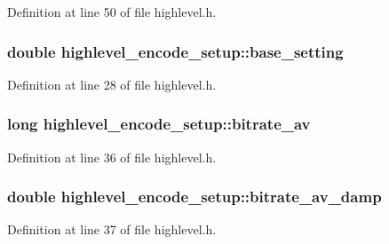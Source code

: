 Definition at line 50 of file highlevel.\+h.

\subsubsection[{\texorpdfstring{base\+\_\+setting}{base_setting}}]{\setlength{\rightskip}{0pt plus 5cm}double highlevel\+\_\+encode\+\_\+setup\+::base\+\_\+setting}\hypertarget{structhighlevel__encode__setup_a3bc13656a789f18e24a9d3a29e0ad2f8}{}\label{structhighlevel__encode__setup_a3bc13656a789f18e24a9d3a29e0ad2f8}


Definition at line 28 of file highlevel.\+h.

\subsubsection[{\texorpdfstring{bitrate\+\_\+av}{bitrate_av}}]{\setlength{\rightskip}{0pt plus 5cm}long highlevel\+\_\+encode\+\_\+setup\+::bitrate\+\_\+av}\hypertarget{structhighlevel__encode__setup_ac9bf8d9dc914f6f82e9ae90429c604f8}{}\label{structhighlevel__encode__setup_ac9bf8d9dc914f6f82e9ae90429c604f8}


Definition at line 36 of file highlevel.\+h.

\subsubsection[{\texorpdfstring{bitrate\+\_\+av\+\_\+damp}{bitrate_av_damp}}]{\setlength{\rightskip}{0pt plus 5cm}double highlevel\+\_\+encode\+\_\+setup\+::bitrate\+\_\+av\+\_\+damp}\hypertarget{structhighlevel__encode__setup_a5c6509b43d015ea6d3508a305cd70f5f}{}\label{structhighlevel__encode__setup_a5c6509b43d015ea6d3508a305cd70f5f}


Definition at line 37 of file highlevel.\+h.

